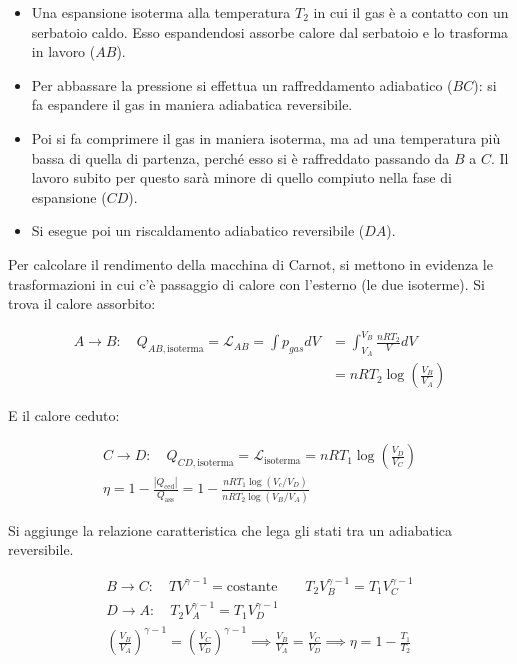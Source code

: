 \begin{itemize}
	\item Una espansione isoterma alla temperatura $T_2$ in cui il gas è a contatto con un serbatoio caldo. Esso espandendosi assorbe calore dal serbatoio e lo trasforma in lavoro ($AB$).
	\item Per abbassare la pressione si effettua un raffreddamento adiabatico ($BC$): si fa espandere il gas in maniera adiabatica reversibile.
	\item Poi si fa comprimere il gas in maniera isoterma, ma ad una temperatura più bassa di quella di partenza, perché esso si è raffreddato passando da $B$ a $C$. Il lavoro subito per questo sarà minore di quello compiuto nella fase di espansione ($CD$).
	\item Si esegue poi un riscaldamento adiabatico reversibile ($DA$).
\end{itemize}

Per calcolare il rendimento della macchina di Carnot, si mettono in evidenza le trasformazioni in cui c'è passaggio di calore con l'esterno (le due isoterme).
Si trova il calore assorbito:

\begin{align*}
	A\to B:\quad Q_{AB,\text{isoterma} } = \mathcal{L}_{AB} = \int p_{gas}dV &= \int_{V_A }^{V_B } \frac{nRT_2 }{V}dV \\
	&= nRT_2\log \left( \frac{V_B }{V_A } \right)
\end{align*}

E il calore ceduto:

\begin{gather*}
	C\to D:\quad Q_{CD,\text{isoterma}} = \mathcal{L}_{\text{isoterma} } = nRT_1\log \left( \frac{V_D }{V_C } \right) \\
	\eta = 1-\frac{|Q_{\text{ced} } |}{Q_{\text{ass} } } = 1 - \frac{nRT_1\log (V_c/V_D  ) }{nRT_2\log (V_B/V_A) }
\end{gather*}

Si aggiunge la relazione caratteristica che lega gli stati tra un adiabatica reversibile.

\begin{gather*}
	B\to C:\quad TV^{\gamma -1}=\text{costante} \qquad T_2 V_B^{\gamma -1}=T_1 V_C^{\gamma -1} \\
	D\to A:\quad T_2 V_A^{\gamma -1} = T_1 V_D^{\gamma -1} \\
	\left( \frac{V_B }{V_A } \right)^{\gamma -1} = \left( \frac{V_C }{V_D } \right)^{\gamma -1} \implies \frac{V_B }{V_A }=\frac{V_C }{V_D } \implies \boxed{\eta = 1-\frac{T_1 }{T_2 }}
\end{gather*}

